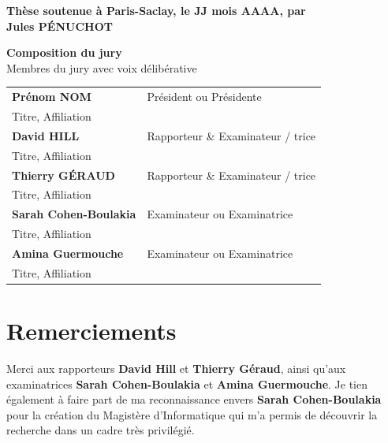 \documentclass[english,12pt,a4paper]{book}
\begin{document}
\begin{titlepage}
\textbf{Thèse soutenue à Paris-Saclay, le JJ mois AAAA, par}\\
\bigskip
\Large {\color{Prune} \textbf{Jules P\'ENUCHOT}} %

\vspace{\fill} %

\bigskip

\flushleft
\small {\color{Prune} \textbf{Composition du jury}}\\
{\color{Prune} \scriptsize {Membres du jury avec voix délibérative}} \\
\vspace{2mm}
\scriptsize
\begin{tabular}{|p{7cm}l}
\arrayrulecolor{Prune}
\textbf{Prénom NOM} &   Président ou Présidente\\
Titre, Affiliation & \\
\textbf{David HILL} &  Rapporteur \& Examinateur / trice \\
Titre, Affiliation   &   \\
\textbf{Thierry G\'ERAUD} &  Rapporteur \& Examinateur / trice \\
Titre, Affiliation  &   \\
\textbf{Sarah Cohen-Boulakia} &  Examinateur ou Examinatrice \\
Titre, Affiliation   &   \\
\textbf{Amina Guermouche} &  Examinateur ou Examinatrice \\
Titre, Affiliation   &   \\

\end{tabular}

\end{titlepage}

\chapter*{Remerciements}

Merci aux rapporteurs \textbf{David Hill} et \textbf{Thierry G\'eraud},
ainsi qu'aux examinatrices \textbf{Sarah Cohen-Boulakia}
et \textbf{Amina Guermouche}.
Je tien \'egalement \`a faire part de ma reconnaissance envers
\textbf{Sarah Cohen-Boulakia} pour la cr\'eation du Magist\`ere d'Informatique
qui m'a permis de d\'ecouvrir la recherche dans un cadre tr\`es privil\'egi\'e.
\end{document}
